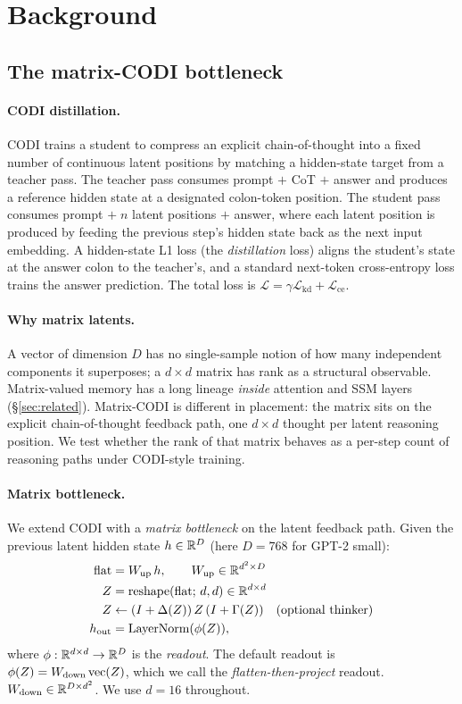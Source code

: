 \section{Background}
\label{sec:background}

\subsection{The matrix-CODI bottleneck}

\paragraph{CODI distillation.} CODI \citep{shen2025codi} trains a
student to compress an explicit chain-of-thought into a fixed number
of continuous latent positions by matching a hidden-state target
from a teacher pass. The teacher pass consumes prompt $+$ CoT $+$
answer and produces a reference hidden state at a designated
colon-token position. The student pass consumes prompt $+\;n$ latent
positions $+$ answer, where each latent position is produced by
feeding the previous step's hidden state back as the next input
embedding. A hidden-state L1 loss (the \emph{distillation} loss)
aligns the student's state at the answer colon to the teacher's,
and a standard next-token cross-entropy loss trains the answer
prediction. The total loss is $\mathcal{L}=\gamma\mathcal{L}_{\text{kd}}+\mathcal{L}_{\text{ce}}$.

\paragraph{Why matrix latents.} A vector of dimension $D$ has no
single-sample notion of how many independent components it
superposes; a $d\times d$ matrix has rank as a structural observable.
Matrix-valued memory has a long lineage \emph{inside} attention and
SSM layers (\S\ref{sec:related}). Matrix-CODI is different in
placement: the matrix sits on the explicit chain-of-thought
feedback path, one $d\times d$ thought per latent reasoning
position. We test whether the rank of that matrix behaves as a
per-step count of reasoning paths under CODI-style training.

\paragraph{Matrix bottleneck.} We extend CODI with a
\emph{matrix bottleneck} on the latent feedback path. Given the
previous latent hidden state $h\in\mathbb{R}^{D}$ (here $D=768$ for GPT-2
small):
\begin{align*}
\text{flat} &= W_{\text{up}}\,h,\qquad W_{\text{up}}\in\mathbb{R}^{d^2\times D}\\
Z &= \text{reshape}(\text{flat};\,d,d)\in\mathbb{R}^{d\times d}\\
Z &\leftarrow (I+\Delta(Z))\,Z\,(I+\Gamma(Z)) \quad\text{(optional thinker)}\\
h_{\text{out}} &= \text{LayerNorm}(\phi(Z)),
\end{align*}
where $\phi:\mathbb{R}^{d\times d}\to\mathbb{R}^{D}$ is the \emph{readout}. The
default readout is $\phi(Z)=W_{\text{down}}\operatorname{vec}(Z)$, which we
call the \emph{flatten-then-project} readout. $W_{\text{down}}\in
\mathbb{R}^{D\times d^2}$. We use $d=16$ throughout.

